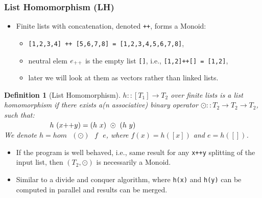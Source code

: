 \documentclass{beamer}
\renewcommand{\emph}[1]{\textcolor{structure}{#1}}
\newcommand{\emp}[1]{\textcolor{DikuRed}{ #1}}
\newtheorem{mydef}{Definition}
\begin{document}
\begin{frame}
  \frametitle{List Homomorphism (LH)}

\begin{itemize}
    \item Finite lists with concatenation, denoted {\tt ++}, forms a Monoid:
        \begin{itemize}
            \item {\tt [1,2,3,4] ++ [5,6,7,8] = [1,2,3,4,5,6,7,8]},
            \item neutral elem $e_{\tt++}$ is the empty list {\tt[]}, 
                i.e., {\tt [1,2]++[] = [1,2]},
            \item later we will look at them as \emph{vectors} rather 
                    than \alert{linked lists}.
        \end{itemize}
\end{itemize}
\pause

\begin{mydef}[List Homomorphism]\label{LHomDef}
$h :: [T_1] \rightarrow T_2$ over finite lists is a {\em list homomorphism}
if there exists a(n associative) binary operator $\odot :: T_2 \rightarrow T_2 \rightarrow T_2$,
such that: \\
$\mbox{ }\mbox{ }\mbox{ }\mbox{ }\mbox{ }\mbox{ }\mbox{ }\mbox{ }\mbox{ }$
\emp{$h \mbox{ } (x{\tt ++}y) = (h\mbox{ }x)\mbox{ }\odot\mbox{ }(h\mbox{ }y)$} \\
We denote $h = hom \mbox{ }(\odot) \mbox{ }f\mbox{ }e$, where $f(x) = h([x])$ 
and $e = h([])$. 
\end{mydef}

\begin{itemize}
    \item If the program is well behaved, i.e., same result
            for any {\tt x++y} splitting of the input list, 
            then $(T_2,\odot)$ is necessarily a Monoid.\smallskip

    \item Similar to a divide and conquer algorithm, where 
            {\tt h(x)} and {\tt h(y)} can be computed in parallel 
            and results can be merged. 
\end{itemize}
\end{frame}
\end{document}
